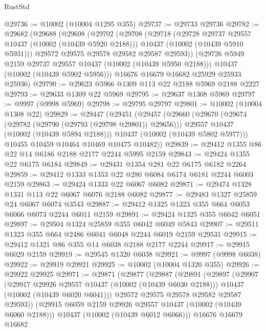 \begin{lexlean}{RustStd}
\begin{coremodule}
@29736 := @10002 (@10004 @1295 @355)
@29737 := @29733 @29736
@29782 := @29682
    (@29688
      (@29698
        (@29702
          (@29708
            (@29718
              (@29728 @29737 @29557 @10437 (@10002 (@10439 @5920 @2188)))
              @10437
              (@10002 (@10439 @5910 @5931)))
            @29572
            @29575
            @29578
            @29582
            @29587
            @29593))
        (@29726 @5949 @2159 @29737 @29557 @10437 (@10002 (@10439 @5950 @2188)))
        @10437
        (@10002 (@10439 @5902 @5956)))
      @16676
      @16679
      @16682
      @25929
      @25933
      @25936)
@29790 := @29623 @5966 @1309 @113 @22 @2188 @5969 @2188 @2227
@29793 := @29633 @1309 @22 @5969
@29795 := @29637 @1308 @5969
@29797 := @9997 (@9998 @5969)
@29798 := @29795 @29797
@29801 := @10002 (@10004 @1308 @22)
@29829 := @29447
    (@29451
      (@29457
        (@29660
          (@29670
            (@29674 (@29782 (@29790 (@29793 (@29798 @29801)) @29656)))
            @29557
            @10437
            (@10002 (@10439 @5894 @2188)))
          @10437
          (@10002 (@10439 @5802 @5977)))
        @10455
        @10459
        @10464
        @10469
        @10475
        @10482))
@29839 := @29412 @1355 @86 @22 @14 @6186 @2188 @2177 @2244 @5995 @2159
@29843 := @29424 @1355 @22 @6175 @6184
@29849 := @29431 @1354 @281 @22 @6175 @6182 @2264
@29859 := @29412 @1333 @1353 @22 @280 @6084 @6174 @6181 @2244 @6003 @2159
@29863 := @29424 @1333 @22 @6067 @6082
@29871 := @29474 @1328 @1331 @113 @22 @6067 @6076 @2188 @6082
@29877 := @29483 @1327 @25859 @24 @6067 @6074 @3543
@29887 := @29412 @1325 @1323 @355 @664 @6053 @6066 @6073 @2244 @6011 @2159
@29891 := @29424 @1325 @355 @6042 @6051
@29897 := @29504 @1324 @25859 @355 @6042 @6049 @5843
@29907 := @29511 @1323 @355 @664 @2486 @6041 @6048 @2244 @6019 @2159 @29531
@29915 := @29412 @1321 @86 @355 @14 @6038 @2188 @2177 @2244
@29917 := @29915 @6029 @2159
@29919 := @29545 @1320 @6038
@29921 := @9997 (@9998 @6038)
@29922 := @29919 @29921
@29925 := @10002 (@10004 @1320 @355)
@29926 := @29922 @29925
@29971 := @29871
    (@29877
      (@29887
        (@29891
          (@29897
            (@29907
              (@29917 @29926 @29557 @10437 (@10002 (@10439 @6030 @2188)))
              @10437
              (@10002 (@10439 @6020 @6041)))
            @29572
            @29575
            @29578
            @29582
            @29587
            @29593))
        (@29915 @6059 @2159 @29926 @29557 @10437 (@10002 (@10439 @6060 @2188)))
        @10437
        (@10002 (@10439 @6012 @6066)))
      @16676
      @16679
      @16682

\end{coremodule}
\end{lexlean}
